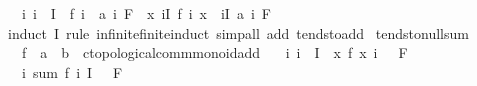 \begin{isabellebody}
\ \ \ {\isachardoublequoteopen}{\isacharparenleft}{\kern0pt}{\isasymAnd}i{\isachardot}{\kern0pt}\ i\ {\isasymin}\ I\ {\isasymLongrightarrow}\ {\isacharparenleft}{\kern0pt}f\ i\ {\isasymlonglongrightarrow}\ a\ i{\isacharparenright}{\kern0pt}\ F{\isacharparenright}{\kern0pt}\ {\isasymLongrightarrow}\ {\isacharparenleft}{\kern0pt}{\isacharparenleft}{\kern0pt}{\isasymlambda}x{\isachardot}{\kern0pt}\ {\isasymSum}i{\isasymin}I{\isachardot}{\kern0pt}\ f\ i\ x{\isacharparenright}{\kern0pt}\ {\isasymlonglongrightarrow}\ {\isacharparenleft}{\kern0pt}{\isasymSum}i{\isasymin}I{\isachardot}{\kern0pt}\ a\ i{\isacharparenright}{\kern0pt}{\isacharparenright}{\kern0pt}\ F{\isachardoublequoteclose}\isanewline
%
\isadelimproof
\ \ %
\endisadelimproof
%
\isatagproof
{}\isamarkupfalse%
\ {\isacharparenleft}{\kern0pt}induct\ I\ rule{\isacharcolon}{\kern0pt}\ infinite{\isacharunderscore}{\kern0pt}finite{\isacharunderscore}{\kern0pt}induct{\isacharparenright}{\kern0pt}\ {\isacharparenleft}{\kern0pt}simp{\isacharunderscore}{\kern0pt}all\ add{\isacharcolon}{\kern0pt}\ tendsto{\isacharunderscore}{\kern0pt}add{\isacharparenright}{\kern0pt}%
\endisatagproof
{\isafoldproof}%
%
\isadelimproof
\isanewline
%
\endisadelimproof
\isanewline
{}\isamarkupfalse%
\ tendsto{\isacharunderscore}{\kern0pt}null{\isacharunderscore}{\kern0pt}sum{\isacharcolon}{\kern0pt}\isanewline
\ \ \ f\ {\isacharcolon}{\kern0pt}{\isacharcolon}{\kern0pt}\ {\isachardoublequoteopen}{\isacharprime}{\kern0pt}a\ {\isasymRightarrow}\ {\isacharprime}{\kern0pt}b\ {\isasymRightarrow}\ {\isacharprime}{\kern0pt}c{\isacharcolon}{\kern0pt}{\isacharcolon}{\kern0pt}topological{\isacharunderscore}{\kern0pt}comm{\isacharunderscore}{\kern0pt}monoid{\isacharunderscore}{\kern0pt}add{\isachardoublequoteclose}\isanewline
\ \ \ {\isachardoublequoteopen}{\isasymAnd}i{\isachardot}{\kern0pt}\ i\ {\isasymin}\ I\ {\isasymLongrightarrow}\ {\isacharparenleft}{\kern0pt}{\isacharparenleft}{\kern0pt}{\isasymlambda}x{\isachardot}{\kern0pt}\ f\ x\ i{\isacharparenright}{\kern0pt}\ {\isasymlonglongrightarrow}\ {}{\isacharparenright}{\kern0pt}\ F{\isachardoublequoteclose}\isanewline
\ \ \ {\isachardoublequoteopen}{\isacharparenleft}{\kern0pt}{\isacharparenleft}{\kern0pt}{\isasymlambda}i{\isachardot}{\kern0pt}\ sum\ {\isacharparenleft}{\kern0pt}f\ i{\isacharparenright}{\kern0pt}\ I{\isacharparenright}{\kern0pt}\ {\isasymlonglongrightarrow}\ {}{\isacharparenright}{\kern0pt}\ F{\isachardoublequoteclose}\isanewline
%
\isadelimproof

\end{isabellebody}

